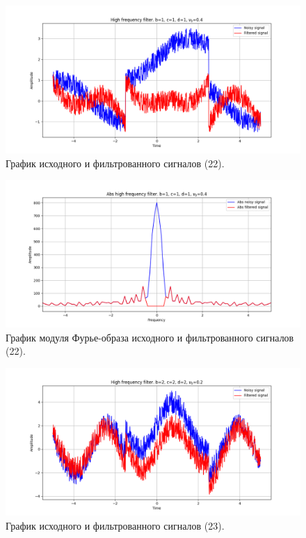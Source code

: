 \documentclass[a4paper, 12pt]{article}
\begin{document}
    \begin{figure}[!htb]
        \centering
        \includegraphics[scale=0.48]{22_u_flt_u_nolow.png}
        \captionsetup{skip=0pt}
        \caption{График исходного и фильтрованного сигналов (22).}
        \label{fig:fig_a}
    \end{figure}
    \begin{figure}[!htb]
        \centering
        \includegraphics[scale=0.48]{22_abs_u_U_nolow.png}
        \captionsetup{skip=0pt}
        \caption{График модуля Фурье-образа исходного и фильтрованного сигналов (22).}
        \label{fig:fig_b}
    \end{figure}
    \newpage
    \begin{figure}[!htb]
        \centering
        \includegraphics[scale=0.48]{23_u_flt_u_nolow.png}
        \captionsetup{skip=0pt}
        \caption{График исходного и фильтрованного сигналов (23).}
        \label{fig:fig_c}
    \end{figure}
\end{document}
